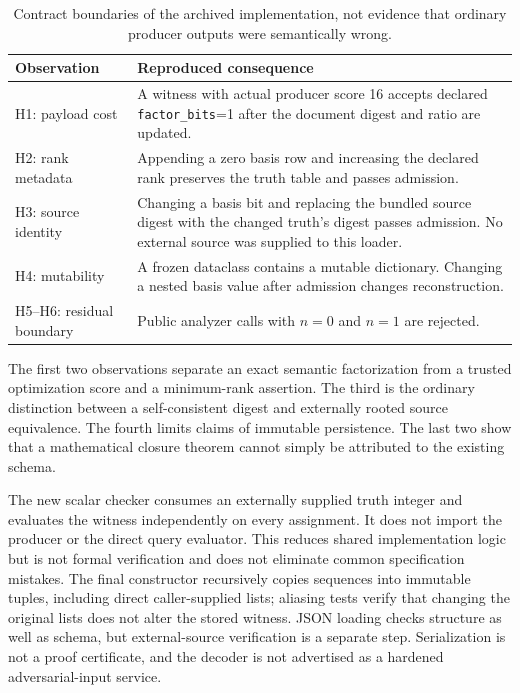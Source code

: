 \documentclass[11pt]{article}
\theoremstyle{definition}\newtheorem{definition}[theorem]{Definition}
\theoremstyle{remark}\newtheorem{remark}[theorem]{Remark}
\begin{document}
\begin{table}[ht]
\centering\small
\begin{tabularx}{\linewidth}{@{}lX@{}}\toprule
Observation & Reproduced consequence\\\midrule
H1: payload cost & A witness with actual producer score 16 accepts declared \texttt{factor\_bits}=1 after the document digest and ratio are updated.\\
H2: rank metadata & Appending a zero basis row and increasing the declared rank preserves the truth table and passes admission.\\
H3: source identity & Changing a basis bit and replacing the bundled source digest with the changed truth's digest passes admission. No external source was supplied to this loader.\\
H4: mutability & A frozen dataclass contains a mutable dictionary. Changing a nested basis value after admission changes reconstruction.\\
H5--H6: residual boundary & Public analyzer calls with $n=0$ and $n=1$ are rejected.\\\bottomrule
\end{tabularx}
\caption{Contract boundaries of the archived implementation, not evidence that ordinary producer outputs were semantically wrong.}\label{tab:audit}
\end{table}

The first two observations separate an exact semantic factorization from a trusted optimization score and a minimum-rank assertion. The third is the ordinary distinction between a self-consistent digest and externally rooted source equivalence. The fourth limits claims of immutable persistence. The last two show that a mathematical closure theorem cannot simply be attributed to the existing schema.

The new scalar checker consumes an externally supplied truth integer and evaluates the witness independently on every assignment. It does not import the producer or the direct query evaluator. This reduces shared implementation logic but is not formal verification and does not eliminate common specification mistakes. The final constructor recursively copies sequences into immutable tuples, including direct caller-supplied lists; aliasing tests verify that changing the original lists does not alter the stored witness. JSON loading checks structure as well as schema, but external-source verification is a separate step. Serialization is not a proof certificate, and the decoder is not advertised as a hardened adversarial-input service.
\end{document}
